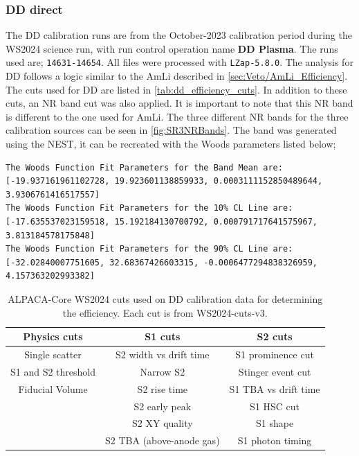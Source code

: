 \subsubsection{DD direct}
The DD calibration runs are from the October-2023 calibration period during the WS2024 science run, with run control operation name \textbf{DD Plasma}.
The runs used are; \lstinline{14631-14654}.
All files were processed with \lstinline{LZap-5.8.0}.
The analysis for DD follows a logic similar to the AmLi described in \autoref{sec:Veto/AmLi_Efficiency}.
The cuts used for DD are listed in \autoref{tab:dd_efficiency_cuts}.
In addition to these cuts, an NR band cut was also applied.
It is important to note that this NR band is different to the one used for AmLi. The three different NR bands for the three calibration sources can be seen in \autoref{fig:SR3NRBands}.
The band was generated using the NEST, it can be recreated with the Woods parameters listed below;
\begin{lstlisting}
The Woods Function Fit Parameters for the Band Mean are:  [-19.937161961102728, 19.923601138859933, 0.0003111152850489644, 3.9306761416517557]
The Woods Function Fit Parameters for the 10% CL Line are:  [-17.635537023159518, 15.192184130700792, 0.000791717641575967, 3.813184578175848]
The Woods Function Fit Parameters for the 90% CL Line are:  [-32.02840007751605, 32.68367426603315, -0.0006477294838326959, 4.157363202993382]
\end{lstlisting}
\begin{table}
	\centering
	\begin{tabular}{c|c|c}
		Physics cuts        & S1 cuts                  & S2 cuts              \\
		\hline
		Single scatter      & S2 width vs drift time   & S1 prominence cut    \\
		S1 and S2 threshold & Narrow S2                & Stinger event cut    \\
		Fiducial Volume     & S2 rise time             & S1 TBA vs drift time \\
		                    & S2 early peak            & S1 HSC cut           \\
		                    & S2 XY quality            & S1 shape             \\
		                    & S2 TBA (above-anode gas) & S1 photon timing     \\
	\end{tabular}
	\caption{ALPACA-Core WS2024 cuts used on DD calibration data for determining the efficiency.
		Each cut is from WS2024-cuts-v3.
	}
	\label{tab:dd_efficiency_cuts}
\end{table}
